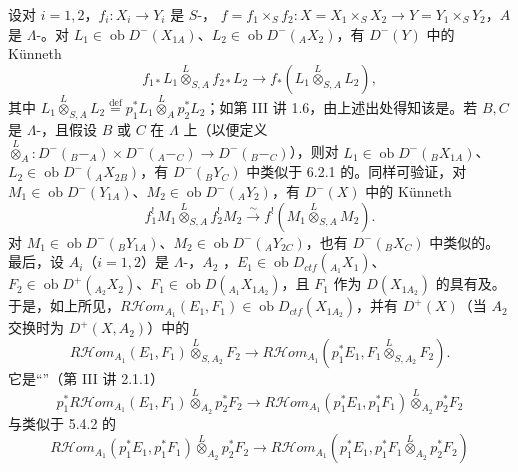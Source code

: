 设对 $i=1,2$，$f_i:X_i\to Y_i$ 是 $S$-，
$f=f_1\times_S f_2:X=X_1\times_S X_2\to Y=Y_1\times_S Y_2$，$A$ 是 $\Lambda$-。对 $L_1\in\operatorname{ob}D^-(X_{1A})$、$L_2\in\operatorname{ob}D^-({}_AX_2)$，有 $D^-(Y)$ 中的 Künneth 
\begin{equation}f_{1*}L_1\overset L\otimes_{S,A}f_{2*}L_2\longrightarrow f_*(L_1\overset L\otimes_{S,A}L_2),\tag{6.2.1}\end{equation}
其中 $L_1\overset L\otimes_{S,A}L_2\overset{\mathrm{def}}=p_1^*L_1\overset L\otimes_Ap_2^*L_2$；如第 III 讲 1.6，由上述出处得知该是。若 $B,C$ 是 $\Lambda$-，且假设 $B$ 或 $C$ 在 $\Lambda$ 上（以便定义 $\overset L\otimes_A:D^-({}_B-_A)\times D^-({}_A-_C)\to D^-({}_B-_C)$），则对 $L_1\in\operatorname{ob}D^-({}_BX_{1A})$、$L_2\in\operatorname{ob}D^-({}_AX_{2B})$，有 $D^-({}_BY_C)$ 中类似于 6.2.1 的。同样可验证，对 $M_1\in\operatorname{ob}D^-(Y_{1A})$、$M_2\in\operatorname{ob}D^-({}_AY_2)$，有 $D^-(X)$ 中的 Künneth 
\begin{equation}f_1^!M_1\overset L\otimes_{S,A}f_2^!M_2\xrightarrow\sim f^!(M_1\overset L\otimes_{S,A}M_2).\tag{6.2.2}\end{equation}
对 $M_1\in\operatorname{ob}D^-({}_BY_{1A})$、$M_2\in\operatorname{ob}D^-({}_AY_{2C})$，也有 $D^-({}_BX_C)$ 中类似的。最后，设 $A_i$（$i=1,2$）是 $\Lambda$-，$A_2$ ，$E_1\in\operatorname{ob}D_{ctf}({}_{A_1}X_1)$、$F_2\in\operatorname{ob}D^+({}_{A_2}X_2)$、$F_1\in\operatorname{ob}D({}_{A_1}X_{1A_2})$，且 $F_1$ 作为 $D(X_{1A_2})$ 的具有及。于是，如上所见，$R\mathcal H\!om_{A_1}(E_1,F_1)\in\operatorname{ob}D_{ctf}(X_{1A_2})$，并有 $D^+(X)$（当 $A_2$ 交换时为 $D^+(X,A_2)$）中的
\begin{equation}R\mathcal H\!om_{A_1}(E_1,F_1)\overset L\otimes_{S,A_2}F_2\longrightarrow R\mathcal H\!om_{A_1}(p_1^*E_1,F_1\overset L\otimes_{S,A_2}F_2).\tag{6.2.3}\end{equation}
它是“”（第 III 讲 2.1.1）
\[p_1^*R\mathcal H\!om_{A_1}(E_1,F_1)\overset L\otimes_{A_2}p_2^*F_2\longrightarrow R\mathcal H\!om_{A_1}(p_1^*E_1,p_1^*F_1)\overset L\otimes_{A_2}p_2^*F_2\]
与类似于 5.4.2 的
\[R\mathcal H\!om_{A_1}(p_1^*E_1,p_1^*F_1)\overset L\otimes_{A_2}p_2^*F_2\longrightarrow R\mathcal H\!om_{A_1}(p_1^*E_1,p_1^*F_1\overset L\otimes_{A_2}p_2^*F_2)\]
